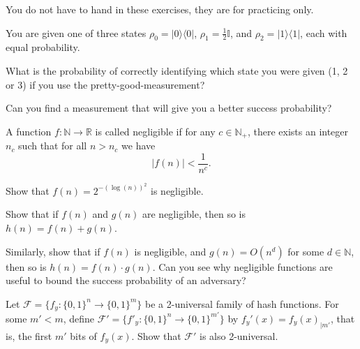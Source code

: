 \documentclass[a4paper,10pt,landscape,twocolumn]{scrartcl}
\newcommand{\ket}[1]{\lvert #1 \rangle}
\newcommand{\bra}[1]{\langle #1 \rvert}
\newcommand{\id}{\mathbb{I}}
\begin{document}
\practiceproblems

{\sffamily\noindent
You do not have to hand in these exercises, they are for practicing only. %
}

\begin{exercise}
You are given one of three states $\rho_0 = \ket0\bra0$, $\rho_1 = \frac{1}{2}\id$, and $\rho_2 = \ket1\bra1$, each with equal probability.
\begin{subex}
	What is the probability of correctly identifying which state you were given (1, 2 or 3) if you use the pretty-good-measurement?
\end{subex}
\begin{subex}
	Can you find a measurement that will give you a better success probability?
\end{subex}
\end{exercise}

\begin{exercise}
	A function $f: \mathbb{N} \to \mathbb{R}$ is called negligible if for any $c \in \mathbb{N}_+$, there exists an integer $n_c$ such that for all $n > n_c$ we have
	\[
	|f(n)| < \frac{1}{n^c}.
	\]
	\begin{subex}
		Show that $f(n) = 2^{-(\log(n))^2}$ is negligible.
	\end{subex}
	\begin{subex}
		Show that if $f(n)$ and $g(n)$ are negligible, then so is $h(n) = f(n) + g(n)$.
	\end{subex}
	\begin{subex}
		Similarly, show that if $f(n)$ is negligible, and $g(n) = O(n^d)$ for some $d \in \mathbb{N}$, then so is $h(n) = f(n) \cdot g(n)$. Can you see why negligible functions are useful to bound the success probability of an adversary?
	\end{subex}
	
\end{exercise}

\begin{exercise}[2-universality]
Let $\mathscr{F} = \{f_y : \{0,1\}^n \to \{0,1\}^m\}$ be a 2-universal family of hash functions. For some $m' < m$, define $\mathscr{F}' = \{f'_y : \{0,1\}^n \to \{0,1\}^{m'}\}$ by $f_y'(x) = f_y(x)_{|m'}$, that is, the first $m'$ bits of $f_y(x)$. Show that $\mathscr{F}'$ is also 2-universal.
\end{exercise}
\end{document}
